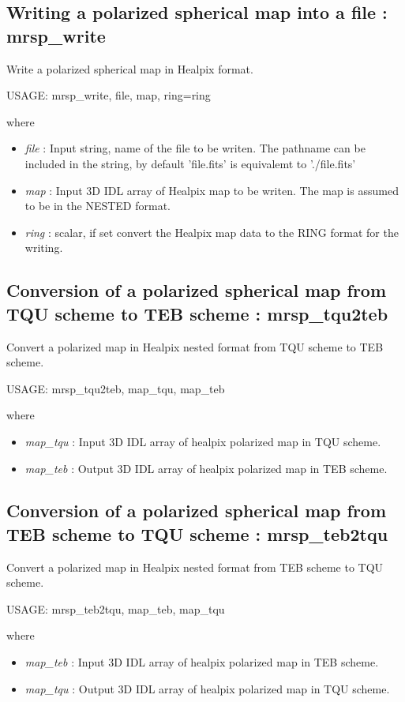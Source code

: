 \subsection{Writing a polarized spherical map into a file : mrsp\_write}
Write a polarized spherical map in Healpix format.
{\bf
\begin{center}
     USAGE: mrsp\_write, file, map, ring=ring
\end{center}}
where
\begin{itemize}
\item {\em file} : Input string, name of the file to be writen. The pathname can be included in the string, by default 'file.fits' is equivalemt to './file.fits'
\item {\em map} : Input 3D IDL array of Healpix map to be writen. The map is assumed to be in the NESTED format.
\item {\em ring} : scalar, if set convert the Healpix map data to the RING format for the writing.
\end{itemize}



\subsection{Conversion of a polarized spherical map from TQU scheme to TEB scheme : mrsp\_tqu2teb}
Convert a polarized map in Healpix nested format from TQU scheme to TEB scheme.
{\bf
\begin{center}
     USAGE: mrsp\_tqu2teb, map\_tqu, map\_teb
\end{center}}
where
\begin{itemize}
\item {\em map\_tqu} : Input 3D IDL array of healpix polarized map in TQU scheme.
\item {\em map\_teb} : Output 3D IDL array of healpix polarized map in TEB scheme.
\end{itemize}



\subsection{Conversion of a polarized spherical map from TEB scheme to TQU scheme : mrsp\_teb2tqu}
Convert a polarized map in Healpix nested format from TEB scheme to TQU scheme.
{\bf
\begin{center}
     USAGE: mrsp\_teb2tqu, map\_teb, map\_tqu
\end{center}}
where
\begin{itemize}
\item {\em map\_teb} : Input 3D IDL array of healpix polarized map in TEB scheme.
\item {\em map\_tqu} : Output 3D IDL array of healpix polarized map in TQU scheme.
\end{itemize}



